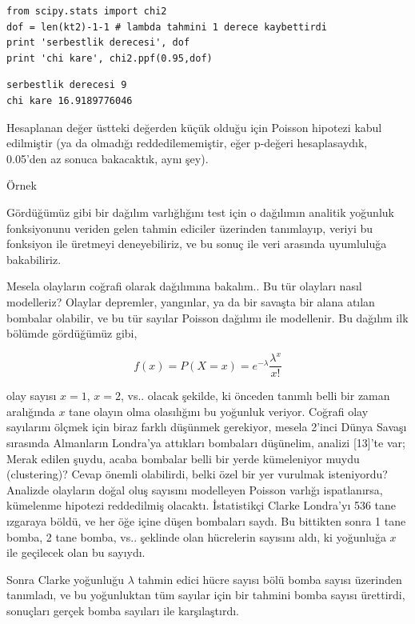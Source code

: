 \documentclass[12pt,fleqn]{article}\usepackage{../../common}
\begin{document}
\begin{verbatim}
from scipy.stats import chi2
dof = len(kt2)-1-1 # lambda tahmini 1 derece kaybettirdi
print 'serbestlik derecesi', dof
print 'chi kare', chi2.ppf(0.95,dof)
\end{verbatim}

\begin{verbatim}
serbestlik derecesi 9
chi kare 16.9189776046
\end{verbatim}

Hesaplanan değer üstteki değerden küçük olduğu için Poisson hipotezi kabul
edilmiştir (ya da olmadığı reddedilememiştir, eğer p-değeri hesaplasaydık,
0.05'den az sonuca bakacaktık, aynı şey). 

Örnek

Gördüğümüz gibi bir dağılım varlığlığını test için o dağılımın analitik yoğunluk
fonksiyonunu veriden gelen tahmin ediciler üzerinden tanımlayıp, veriyi bu
fonksiyon ile üretmeyi deneyebiliriz, ve bu sonuç ile veri arasında uyumluluğa
bakabiliriz.

Mesela olayların coğrafi olarak dağılımına bakalım..  Bu tür olayları nasıl
modelleriz? Olaylar depremler, yangınlar, ya da bir savaşta bir alana atılan
bombalar olabilir, ve bu tür sayılar Poisson dağılımı ile modellenir. Bu dağılım
ilk bölümde gördüğümüz gibi,

$$ f(x) = P(X=x) = e^{-\lambda}\frac{\lambda^{x}}{x!} $$

olay sayısı $x=1$, $x=2$, vs.. olacak şekilde, ki önceden tanımlı belli bir
zaman aralığında $x$ tane olayın olma olasılığını bu yoğunluk veriyor. Coğrafi
olay sayılarını ölçmek için biraz farklı düşünmek gerekiyor, mesela 2'inci Dünya
Savaşı sırasında Almanların Londra'ya attıkları bombaları düşünelim, analizi
[13]'te var; Merak edilen şuydu, acaba bombalar belli bir yerde kümeleniyor
muydu (clustering)? Cevap önemli olabilirdi, belki özel bir yer vurulmak
isteniyordu? Analizde olayların doğal oluş sayısını modelleyen Poisson varlığı
ispatlanırsa, kümelenme hipotezi reddedilmiş olacaktı. İstatistikçi Clarke
Londra'yı 536 tane ızgaraya böldü, ve her öğe içine düşen bombaları saydı. Bu
bittikten sonra 1 tane bomba, 2 tane bomba, vs.. şeklinde olan hücrelerin
sayısını aldı, ki yoğunluğa $x$ ile geçilecek olan bu sayıydı.

Sonra Clarke yoğunluğu $\lambda$ tahmin edici hücre sayısı bölü bomba sayısı
üzerinden tanımladı, ve bu yoğunluktan tüm sayılar için bir tahmini bomba
sayısı ürettirdi, sonuçları gerçek bomba sayıları ile karşılaştırdı.
\end{document}
